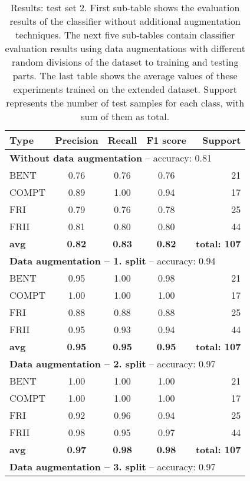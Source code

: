 \documentclass[fleqn,usenatbib]{mnras}
\begin{document}
\begin{table}
	\centering
	\caption{Results: test set 2. First sub-table shows the evaluation results of the classifier without additional augmentation techniques. The next five sub-tables contain classifier evaluation results using data augmentations with different random divisions of the dataset to training and testing parts. The last table shows the average values of these experiments trained on the extended dataset. Support represents the number of test samples for each class, with sum of them as total.}
	\label{tab:result_test2}
	\begin{tabular}{lcccr} 
		\hline
	    \textbf{Type} & \textbf{Precision} & \textbf{Recall} & \textbf{F1 score} &  \textbf{Support} \\ 
	    \hline
		\multicolumn{5}{l}{\textbf{Without data augmentation} -- accuracy: 0.81}   \\ \hline
		BENT & 0.76 & 0.76 & 0.76 & 21\\
		COMPT & 0.89 & 1.00 &  0.94  & 17\\
		FRI & 0.79 & 0.76 & 0.78  & 25\\
		FRII & 0.81 & 0.80 & 0.80 & 44\\
		\hline
		\textbf{avg} & \textbf{0.82}  &\textbf{ 0.83} & \textbf{0.82} & \textbf{total: 107}\\
		\hline \hline
		\multicolumn{5}{l}{\textbf{Data augmentation -- 1. split} -- accuracy: 0.94}   \\ \hline
		BENT & 0.95 & 1.00 &  0.98 & 21\\
		COMPT & 1.00 & 1.00 &  1.00  &17 \\
		FRI & 0.88 &  0.88 &  0.88  & 25\\
		FRII & 0.95 & 0.93  & 0.94 & 44\\
		\hline
		\textbf{avg} & \textbf{0.95}  &\textbf{ 0.95} & \textbf{0.95} & \textbf{total: 107}\\
		\hline
		\multicolumn{5}{l}{\textbf{Data augmentation -- 2. split} -- accuracy: 0.97}   \\ \hline
		BENT & 1.00 & 1.00 &  1.00 & 21\\
		COMPT & 1.00 & 1.00 &  1.00  &17 \\
		FRI & 0.92 &  0.96 &  0.94 & 25\\
		FRII & 0.98 & 0.95  & 0.97 & 44\\
		\hline
		\textbf{avg} &  \textbf{0.97} & \textbf{0.98} & \textbf{0.98} & \textbf{total: 107}\\
		\hline
		\multicolumn{5}{l}{\textbf{Data augmentation -- 3. split} -- accuracy: 0.97}   \\ \hline

\end{tabular}
\end{table}
\end{document}

